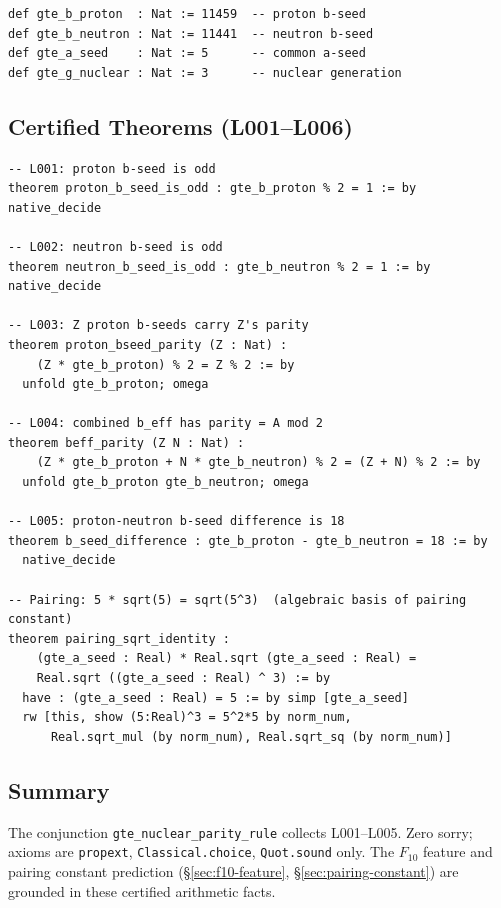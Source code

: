 \documentclass[9pt,twocolumn]{extarticle}
\begin{document}
\begin{lstlisting}[language=lean4, basicstyle=\ttfamily\small, frame=single]
def gte_b_proton  : Nat := 11459  -- proton b-seed
def gte_b_neutron : Nat := 11441  -- neutron b-seed
def gte_a_seed    : Nat := 5      -- common a-seed
def gte_g_nuclear : Nat := 3      -- nuclear generation
\end{lstlisting}

\subsection*{Certified Theorems (L001--L006)}

\begin{lstlisting}[language=lean4, basicstyle=\ttfamily\small, frame=single]
-- L001: proton b-seed is odd
theorem proton_b_seed_is_odd : gte_b_proton % 2 = 1 := by native_decide

-- L002: neutron b-seed is odd
theorem neutron_b_seed_is_odd : gte_b_neutron % 2 = 1 := by native_decide

-- L003: Z proton b-seeds carry Z's parity
theorem proton_bseed_parity (Z : Nat) :
    (Z * gte_b_proton) % 2 = Z % 2 := by
  unfold gte_b_proton; omega

-- L004: combined b_eff has parity = A mod 2
theorem beff_parity (Z N : Nat) :
    (Z * gte_b_proton + N * gte_b_neutron) % 2 = (Z + N) % 2 := by
  unfold gte_b_proton gte_b_neutron; omega

-- L005: proton-neutron b-seed difference is 18
theorem b_seed_difference : gte_b_proton - gte_b_neutron = 18 := by
  native_decide

-- Pairing: 5 * sqrt(5) = sqrt(5^3)  (algebraic basis of pairing constant)
theorem pairing_sqrt_identity :
    (gte_a_seed : Real) * Real.sqrt (gte_a_seed : Real) =
    Real.sqrt ((gte_a_seed : Real) ^ 3) := by
  have : (gte_a_seed : Real) = 5 := by simp [gte_a_seed]
  rw [this, show (5:Real)^3 = 5^2*5 by norm_num,
      Real.sqrt_mul (by norm_num), Real.sqrt_sq (by norm_num)]
\end{lstlisting}

\subsection*{Summary}

The conjunction \texttt{gte\_nuclear\_parity\_rule} collects L001--L005. Zero sorry; axioms are \texttt{propext}, \texttt{Classical.choice}, \texttt{Quot.sound} only. The $F_{10}$ feature and pairing constant prediction (\S\ref{sec:f10-feature}, \S\ref{sec:pairing-constant}) are grounded in these certified arithmetic facts.
\end{document}
